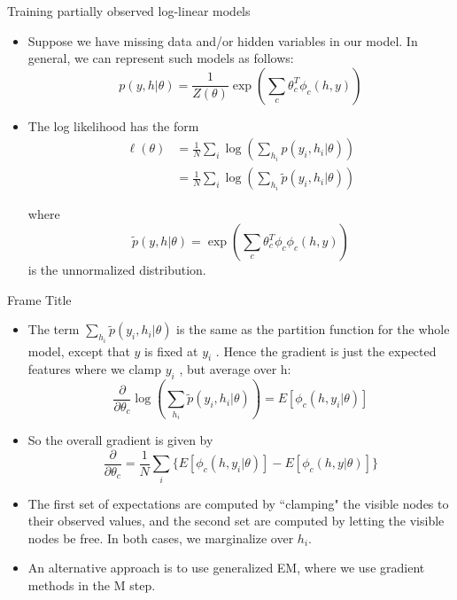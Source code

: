 \documentclass[10pt,mathserif]{beamer}
\begin{document}
\begin{frame}{Training partially observed log-linear models}
\begin{itemize}
    \item Suppose we have missing data and/or hidden variables in our model. In general, we can represent such models as follows:
    \begin{equation}
        p(y,h|\theta) = \frac{1}{Z(\theta)} \exp(\sum_c\theta_c^T\phi_c(h,y))
    \end{equation}
    
    \item The log likelihood has the form
    \begin{equation}
        \begin{split}
            \ell(\theta) & = \frac{1}{N} \sum_i \log(\sum_{h_i} p(y_i,h_i|\theta)) \\
            & = \frac{1}{N} \sum_i \log(\sum_{h_i} \tilde{p}(y_i,h_i|\theta))
        \end{split}
    \end{equation}
    
    where 
    \begin{equation}
        \tilde{p}(y,h|\theta) = \exp(\sum_c\theta_c^T\phi_c \phi_c(h,y))
    \end{equation}
    is the unnormalized distribution.
\end{itemize}
\end{frame}

\begin{frame}{Frame Title}
\begin{itemize}
    \item The term $\sum_{h_i} \tilde{p}(y_i,h_i|\theta)$ is the same as the partition function for the whole model, except that $y$ is fixed at $y_i$ . Hence the gradient is just the expected features where we clamp $y_i$ , but average over h:
    \begin{equation}
        \frac{\partial}{\partial\theta_c}\log(\sum_{h_i} \tilde{p}(y_i,h_i|\theta)) = E[\phi_c (h,y_i|\theta)]
    \end{equation}
    
    \item So the overall gradient is given by
    \begin{equation}
        \frac{\partial}{\partial\theta_c} = \frac{1}{N}\sum_i \{E[\phi_c (h,y_i|\theta)]  - E[\phi_c (h,y|\theta)]  \}
    \end{equation}
    
    \item The first set of expectations are computed by ``clamping" the visible nodes to their observed values, and the second set are computed by letting the visible nodes be free. In both cases, we marginalize over $h_i$.
    
    \item An alternative approach is to use generalized EM, where we use gradient methods in the M step.
\end{itemize}
\end{frame}
\end{document}
